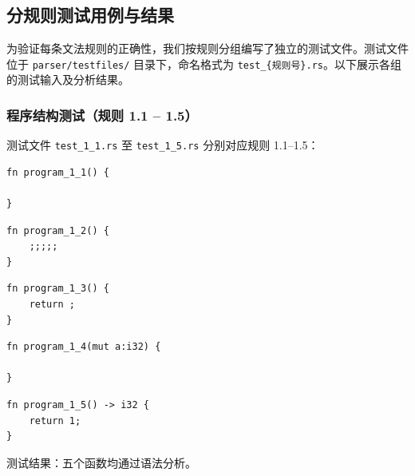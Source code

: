 \documentclass[12pt,a4paper]{ctexart}
\begin{document}

\subsection{分规则测试用例与结果}

为验证每条文法规则的正确性，我们按规则分组编写了独立的测试文件。测试文件位于 \texttt{parser/testfiles/} 目录下，命名格式为 \texttt{test\_\{规则号\}.rs}。以下展示各组的测试输入及分析结果。

\subsubsection{程序结构测试（规则 1.1 -- 1.5）}

测试文件 \texttt{test\_1\_1.rs} 至 \texttt{test\_1\_5.rs} 分别对应规则 1.1--1.5：

\begin{lstlisting}[language=RustLike, caption={test\_1\_1.rs -- 空函数（规则 1.1）}]
fn program_1_1() {

}
\end{lstlisting}

\begin{lstlisting}[language=RustLike, caption={test\_1\_2.rs -- 空语句（规则 1.2）}]
fn program_1_2() {
    ;;;;;
}
\end{lstlisting}

\begin{lstlisting}[language=RustLike, caption={test\_1\_3.rs -- 返回语句（规则 1.3）}]
fn program_1_3() {
    return ;
}
\end{lstlisting}

\begin{lstlisting}[language=RustLike, caption={test\_1\_4.rs -- 函数输入：形参列表（规则 1.4）}]
fn program_1_4(mut a:i32) {

}
\end{lstlisting}

\begin{lstlisting}[language=RustLike, caption={test\_1\_5.rs -- 函数输出：返回类型（规则 1.5）}]
fn program_1_5() -> i32 {
    return 1;
}
\end{lstlisting}

测试结果：五个函数均通过语法分析。

\end{document}
